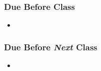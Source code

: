 \documentclass[]{book}
\theoremstyle{definition}
\theoremstyle{definition}
\theoremstyle{definition}
\theoremstyle{remark}
\begin{document}
\subsubsection*{Due Before Class}\label{due-before-class-15}

\begin{itemize}
\item
\end{itemize}

\subsubsection*{\texorpdfstring{Due Before \emph{Next}
Class}{Due Before Next Class}}\label{due-before-next-class-16}

\begin{itemize}
\item
\end{itemize}


\end{document}
